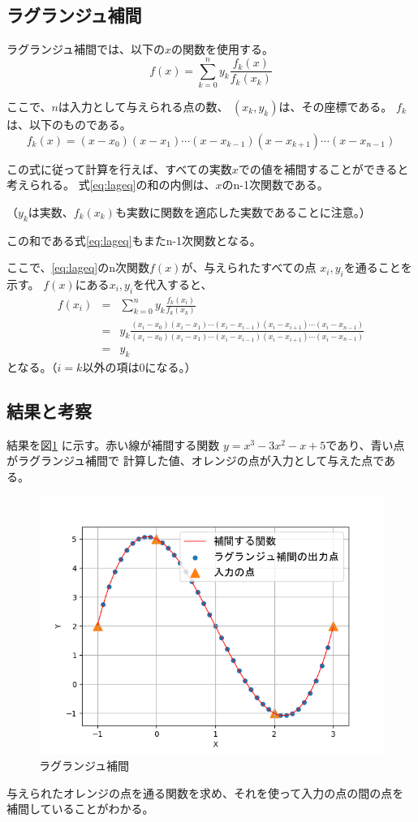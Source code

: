 \documentclass{jsarticle}
\begin{document}
\subsection{ラグランジュ補間}
ラグランジュ補間では、以下の\(x\)の関数を使用する。
\begin{equation}
    f(x)=\sum^n_{k=0}y_k\frac{f_k(x)}{f_k(x_k)}
    \label{eq:lageq} 
\end{equation}

ここで、\(n\)は入力として与えられる点の数、
\((x_k,y_k)\)は、その座標である。
\(f_k\)は、以下のものである。
\begin{equation}
    f_k(x)=(x-x_0)(x-x_1)\cdots (x-x_{k-1})(x-x_{k+1})\cdots (x-x_{n-1})
    \label{eq:legeq2}
\end{equation}

この式に従って計算を行えば、すべての実数\(x\)での値を補間することができると考えられる。
式\ref{eq:lageq}の和の内側は、\(x\)のn-1次関数である。

（\(y_k\)は実数、\(f_k(x_k)\)も実数に関数を適応した実数であることに注意。）

この和である式\ref{eq:lageq}もまたn-1次関数となる。

ここで、\ref{eq:lageq}のn次関数\(f(x)\)が、与えられたすべての点
\(x_i,y_i\)を通ることを示す。
\(f(x)\)にある\(x_i,y_i\)を代入すると、
\begin{eqnarray*}
    f(x_i)& = & \sum^n_{k=0}y_k\frac{f_k(x_i)}{f_k(x_k)} \\
    & = & y_k\frac{
        (x_i-x_0)(x_i-x_1)\cdots (x_i-x_{i-1})(x_i-x_{i+1})\cdots (x_i-x_{n-1})
    }{
        (x_i-x_0)(x_i-x_1)\cdots (x_i-x_{i-1})(x_i-x_{i+1})\cdots (x_i-x_{n-1})
    } \\
    & = & y_k 
\end{eqnarray*}
となる。（\(i=k\)以外の項は0になる。）
\subsection{結果と考察}
結果を図\ref{fig:laggraph} に示す。赤い線が補間する関数
\(y=x^3-3x^2-x+5\)であり、青い点がラグランジュ補間で
計算した値、オレンジの点が入力として与えた点である。

\begin{figure}[htbp]
    \begin{center}
        \includegraphics[width=0.5\hsize]{lag.png}
        \caption{ラグランジュ補間}\label{fig:laggraph}      
    \end{center}
\end{figure}
与えられたオレンジの点を通る関数を求め、それを使って入力の点の間の点を
補間していることがわかる。
\end{document}
